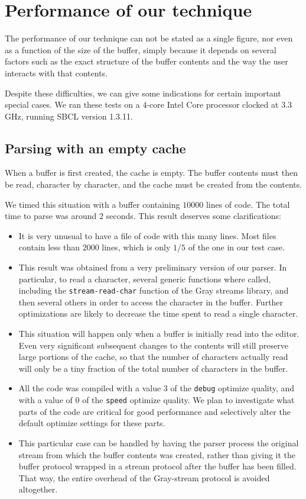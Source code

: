 \section{Performance of our technique}

The performance of our technique can not be stated as a single figure,
nor even as a function of the size of the buffer, simply because it
depends on several factors such as the exact structure of the buffer
contents and the way the user interacts with that contents.

Despite these difficulties, we can give some indications for certain
important special cases.  We ran these tests on a $4$-core Intel Core
processor clocked at $3.3$GHz, running SBCL version 1.3.11.

\subsection{Parsing with an empty cache}

When a buffer is first created, the cache is empty.  The buffer
contents must then be read, character by character, and the cache must
be created from the contents.

We timed this situation with a buffer containing $10000$ lines of
\commonlisp{} code.  The total time to parse was around $2$ seconds.
This result deserves some clarifications:

\begin{itemize}
\item It is very unusual to have a file of \commonlisp{} code with
  this many lines.  Most files contain less than $2000$ lines, which
  is only $1/5$ of the one in our test case.
\item This result was obtained from a very preliminary version of our
  parser.  In particular, to read a character, several generic
  functions where called, including the \texttt{stream-read-char}
  function of the Gray streams library, and then several others in
  order to access the character in the buffer.  Further optimizations
  are likely to decrease the time spent to read a single character.
\item This situation will happen only when a buffer is initially read
  into the editor.  Even very significant subsequent changes to the
  contents will still preserve large portions of the cache, so that
  the number of characters actually read will only be a tiny fraction
  of the total number of characters in the buffer.
\item All the code was compiled with a value $3$ of the \texttt{debug}
  optimize quality, and with a value of $0$ of the \texttt{speed}
  optimize quality.  We plan to investigate what parts of the code are
  critical for good performance and selectively alter the default
  optimize settings for these parts.
\item This particular case can be handled by having the parser process
  the original stream from which the buffer contents was created,
  rather than giving it the buffer protocol wrapped in a stream
  protocol after the buffer has been filled.  That way, the entire
  overhead of the Gray-stream protocol is avoided altogether.
\end{itemize}

